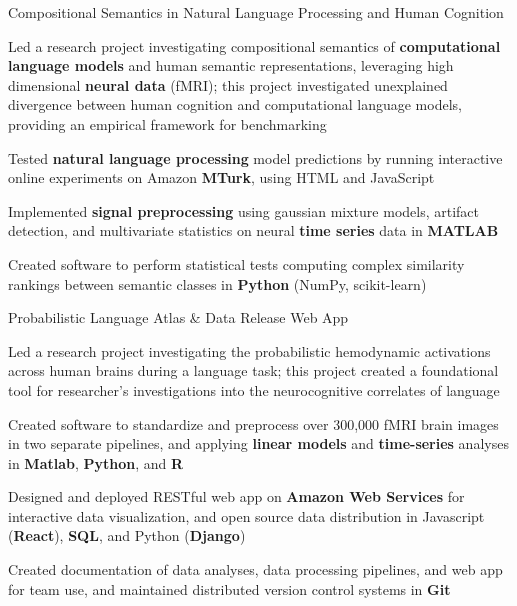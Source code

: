 \begin{cventries}
  \projectentry
  {Compositional Semantics in Natural Language Processing and Human Cognition} %
  {\href{https://github.com/jaffourt/Project-Portfolio/tree/main/Project4}{}} %
  {
    \begin{cvitems} %
      \item {Led a research project investigating compositional semantics of \textbf{computational language models}
      and human semantic representations, leveraging high dimensional \textbf{neural data} (fMRI);
      this project investigated unexplained divergence between human cognition and computational language models,
        providing an empirical framework for benchmarking}
      \item{Tested \textbf{natural language processing} model predictions by running interactive online experiments
      on Amazon \textbf{MTurk}, using HTML and JavaScript}
      \item{Implemented \textbf{signal preprocessing} using gaussian mixture models, artifact detection, and
      multivariate statistics on neural \textbf{time series} data in \textbf{MATLAB}}
      \item {Created software to perform statistical tests computing complex similarity rankings between semantic
      classes in \textbf{Python} (NumPy, scikit-learn)}
    \end{cvitems}
  }

  \projectentry
  {Probabilistic Language Atlas \& Data Release Web App} %
  {\href{https://github.com/jaffourt/Project-Portfolio/tree/main/Project1}{}} %
  {
    \begin{cvitems} %
      \item {Led a research project investigating the probabilistic hemodynamic activations across human brains during
      a language task; this project created a foundational tool for researcher's investigations into the neurocognitive
      correlates of language}
      \item {Created software to standardize and preprocess over 300,000 fMRI brain images in two separate
      pipelines, and applying \textbf{linear models} and \textbf{time-series} analyses in \textbf{Matlab},
        \textbf{Python}, and \textbf{R}}
      \item {Designed and deployed RESTful web app on \textbf{Amazon Web Services} for interactive data visualization,
        and open source data distribution in Javascript (\textbf{React}), \textbf{SQL}, and Python (\textbf{Django})
        \href{http://54.84.230.25:3000/}{\faGlobe}}
      \item {Created documentation of data analyses, data processing pipelines, and web app for team use, and maintained
      distributed version control systems in \textbf{Git}}
    \end{cvitems}
  }


\end{cventries}
